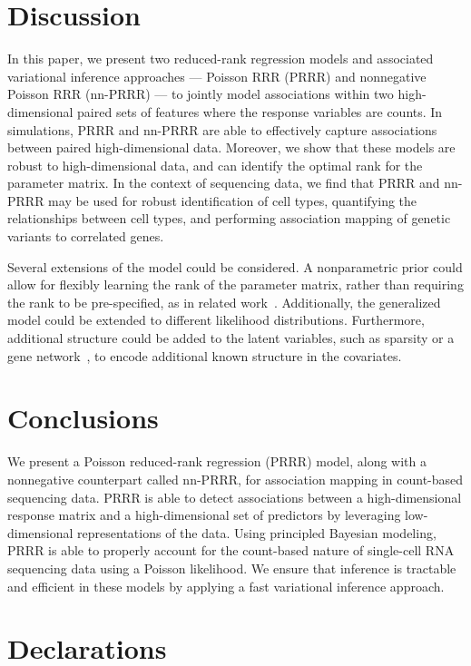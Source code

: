 \documentclass{bmcart}
\begin{document}
\section*{Discussion}
In this paper, we present two reduced-rank regression models and associated variational inference approaches --- Poisson RRR (PRRR) and nonnegative Poisson RRR (nn-PRRR) --- to jointly model associations within two high-dimensional paired sets of features where the response variables are counts.  In simulations, PRRR and nn-PRRR are able to effectively capture associations between paired high-dimensional data. Moreover, we show that these models are robust to high-dimensional data, and can identify the optimal rank for the parameter matrix. In the context of sequencing data, we find that PRRR and nn-PRRR may be used for robust identification of cell types, quantifying the relationships between cell types, and performing association mapping of genetic variants to correlated genes. 

Several extensions of the model could be considered. A nonparametric prior could allow for flexibly learning the rank of the parameter matrix, rather than requiring the rank to be pre-specified, as in related work~\citep{valente2015nonparametric}. Additionally, the generalized model could be extended to different likelihood distributions. Furthermore, additional structure could be added to the latent variables, such as sparsity or a gene network~\citep{engelhardt2014bayesian, elyanow2020netnmf}, to encode additional known structure in the covariates. 

\section*{Conclusions}
We present a Poisson reduced-rank regression (PRRR) model, along with a nonnegative counterpart called nn-PRRR, for association mapping in count-based sequencing data. PRRR is able to detect associations between a high-dimensional response matrix and a high-dimensional set of predictors by leveraging low-dimensional representations of the data. Using principled Bayesian modeling, PRRR is able to properly account for the count-based nature of single-cell RNA sequencing data using a Poisson likelihood. We ensure that inference is tractable and efficient in these models by applying a fast variational inference approach.

\section*{Declarations}
\end{document}
